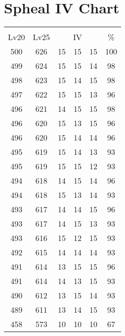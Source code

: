 \documentclass{article}%
\begin{document}
%
\normalsize%
\section{Spheal IV Chart}%
\label{sec:Spheal IV Chart}%
\renewcommand{\arraystretch}{1.5}%
\begin{tabular}{|c|c|c|c|c|c|}%
\hline%
\multicolumn{6}{|c|}{\textcolor{white}{ 
\linebreak{Spheal}
}%
\cellcolor{black}}\\%
\multicolumn{1}{|c}{Lv20}&\multicolumn{1}{c|}{Lv25}&\multicolumn{3}{c|}{IV}&\multicolumn{1}{|c|}{\%}\\%
\hline%
\rowcolor{color100}%
500&626&15&15&15&100\\%
\hline%
\rowcolor{color98}%
499&624&15&15&14&98\\%
\hline%
\rowcolor{color98}%
498&623&15&14&15&98\\%
\hline%
\rowcolor{color96}%
497&622&15&15&13&96\\%
\hline%
\rowcolor{color98}%
496&621&14&15&15&98\\%
\hline%
\rowcolor{color96}%
496&620&15&13&15&96\\%
\hline%
\rowcolor{color96}%
496&620&15&14&14&96\\%
\hline%
\rowcolor{color93}%
495&619&15&14&13&93\\%
\hline%
\rowcolor{color93}%
495&619&15&15&12&93\\%
\hline%
\rowcolor{color96}%
494&618&14&15&14&96\\%
\hline%
\rowcolor{color93}%
494&618&15&13&14&93\\%
\hline%
\rowcolor{color96}%
493&617&14&14&15&96\\%
\hline%
\rowcolor{color93}%
493&617&14&15&13&93\\%
\hline%
\rowcolor{color93}%
493&616&15&12&15&93\\%
\hline%
\rowcolor{color93}%
492&615&14&14&14&93\\%
\hline%
\rowcolor{color96}%
491&614&13&15&15&96\\%
\hline%
\rowcolor{color93}%
491&614&14&13&15&93\\%
\hline%
\rowcolor{color93}%
490&612&13&15&14&93\\%
\hline%
\rowcolor{color93}%
489&611&13&14&15&93\\%
\hline%
\rowcolor{color91}%
458&573&10&10&10&67\\%
\end{tabular}

%
\end{document}
